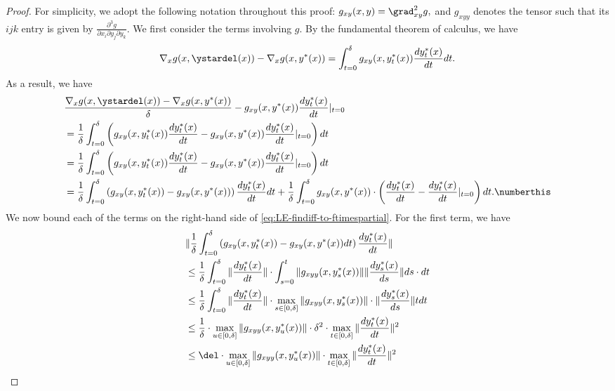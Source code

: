 \lemLineqFiniteDiffEqualsGradF*
\begin{proof}
For simplicity, we adopt the following notation throughout this proof:
$g_{xy}(x,y) = \grad^2_{xy} g,$ and $g_{xyy}$ denotes the tensor such that its $ijk$ entry is given by $\frac{\partial^3 g}{\partial x_i \partial y_j \partial y_k}$. 
We first consider the terms involving $g$. 
By the fundamental theorem of calculus, we have  \[ \nabla_{x}g(x,\ystardel(x))-\nabla_{x}g(x,y^{*}(x)) =\int_{t=0}^{\delta}g_{xy}(x,y_{t}^{*}(x))\frac{dy_{t}^{*}(x)}{dt} dt. \] As a result, we have 
\begin{align*}
&\frac{\nabla_{x}g(x,\ystardel(x))-\nabla_{x}g(x,y^{*}(x))}{\delta}-g_{xy}(x,y^{*}(x))\frac{dy_{t}^{*}(x)}{dt}|_{t=0}\\
& =\frac{1}{\delta}\int_{t=0}^{\delta}\left(g_{xy}(x,y_{t}^{*}(x))\frac{dy_{t}^{*}(x)}{dt}-g_{xy}(x,y^{*}(x))\frac{dy_{t}^{*}(x)}{dt}|_{t=0} \right)dt\\
 & =\frac{1}{\delta}\int_{t=0}^{\delta}\left(g_{xy}(x,y_{t}^{*}(x))\frac{dy_{t}^{*}(x)}{dt}-g_{xy}(x,y^{*}(x))\frac{dy_t^{*}(x)}{dt}|_{t=0}\right) dt\\
 & =\frac{1}{\delta}\int_{t=0}^{\delta}\left(g_{xy}(x,y_{t}^{*}(x))-g_{xy}(x,y^{*}(x))\right) \frac{dy_{t}^{*}(x)}{dt} dt +\frac{1}{\delta}\int_{t=0}^{\delta}g_{xy}(x,y^{*}(x))\cdot\left(\frac{dy_{t}^{*}(x)}{dt}-\frac{dy_t^{*}(x)} {dt}|_{t=0}\right)dt.\numberthis\label{eq:LE-findiff-to-ftimespartial} \end{align*} We now bound each of the terms on the right-hand side of \cref{eq:LE-findiff-to-ftimespartial}. 
 For the first term, we have  
 \begin{align*}
&\|\frac{1}{\delta}\int_{t=0}^{\delta}\left(g_{xy}(x,y_{t}^{*}(x))-g_{xy}(x,y^{*}(x))dt\right) \frac{dy_{t}^{*}(x)}{dt}\|\\
&\leq\frac{1}{\delta}\int_{t=0}^{\delta}\|\frac{dy_{t}^{*}(x)}{dt}\|\cdot\int_{s=0}^{t}\|g_{xyy}(x,y_{s}^{*}(x))\|\|\frac{dy_{s}^{*}(x)}{ds}\|ds\cdot dt\\
&\leq\frac{1}{\delta}\int_{t=0}^{\delta}\|\frac{dy_{t}^{*}(x)}{dt}\|\cdot\max_{s\in[0,\delta]}\|g_{xyy}(x,y_{s}^{*}(x))\|\cdot\|\frac{dy_{s}^{*}(x)}{ds}\|tdt\\
&\leq\frac{1}{\delta}\cdot\max_{u\in[0,\delta]}\|g_{xyy}(x,y_{u}^{*}(x))\|\cdot\delta^{2}\cdot\max_{t\in[0,\delta]}\|\frac{dy_{t}^{*}(x)}{dt}\|^{2}\\&\leq\del\cdot\max_{u\in[0,\delta]}\|g_{xyy}(x,y_{u}^{*}(x))\|\cdot\max_{t\in[0,\delta]}\|\frac{dy_{t}^{*}(x)}{dt}\|^{2}

\end{align*}
\end{proof}

